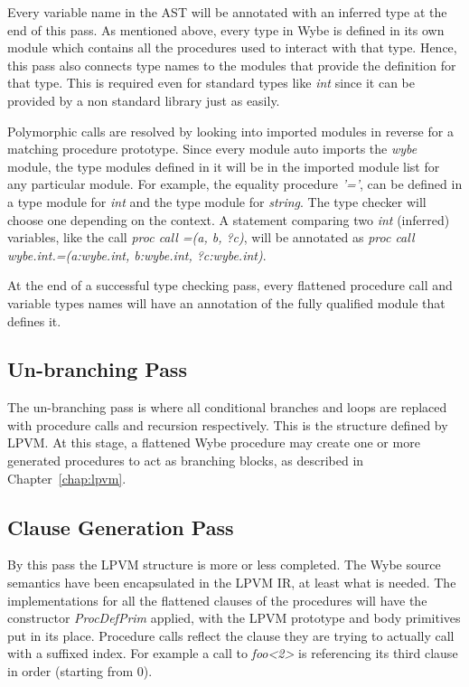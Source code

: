 Every variable name in the AST will be annotated with an inferred type at the
end of this pass. As mentioned above, every type in Wybe is defined in its own
module which contains all the procedures used to interact with that
type. Hence, this pass also connects type names to the modules that provide the
definition for that type. This is required even for standard types like
\textit{int} since it can be provided by a non standard library just as easily.

Polymorphic calls are resolved by looking into imported modules in reverse for
a matching procedure prototype. Since every module auto imports the
\textit{wybe} module, the type modules defined in it will be in the imported
module list for any particular module. For example, the equality procedure
\textit{'='}, can be defined in a type module for \textit{int} and the type
module for \textit{string}. The type checker will choose one depending on the
context. A statement comparing two \textit{int} (inferred) variables, like the
call \textit{proc call =(a, b, ?c)}, will be annotated as \textit{proc call
  wybe.int.=(a:wybe.int, b:wybe.int, ?c:wybe.int)}.

At the end of a successful type checking pass, every flattened procedure call
and variable types names will have an annotation of the fully qualified module
that defines it.


\subsection{Un-branching Pass}

The un-branching pass is where all conditional branches and loops are replaced
with procedure calls and recursion respectively. This is the structure defined
by LPVM. At this stage, a flattened Wybe procedure may create one or more
generated procedures to act as branching blocks, as described in
Chapter~\ref{chap:lpvm}.


\subsection{Clause Generation Pass}

By this pass the LPVM structure is more or less completed. The Wybe source
semantics have been encapsulated in the LPVM IR, at least what is needed. The
implementations for all the flattened clauses of the procedures will have the
constructor \textit{ProcDefPrim} applied, with the LPVM prototype and body
primitives put in its place. Procedure calls reflect the clause they are trying
to actually call with a suffixed index. For example a call to \textit{foo<2>}
is referencing its third clause in order (starting from 0). 

